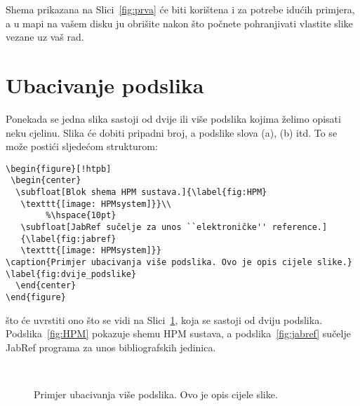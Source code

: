 Shema prikazana na Slici~\ref{fig:prva} će biti korištena i za potrebe idućih primjera, a {\color{blue} u mapi na vašem disku ju obrišite nakon što počnete pohranjivati vlastite slike vezane uz vaš rad}.


\section{Ubacivanje podslika}
Ponekada se jedna slika sastoji od dvije ili više podslika kojima želimo opisati neku cjelinu. Slika će dobiti pripadni broj, a podslike slova (a), (b) itd.
To se može postići sljedećom strukturom:
\begin{verbatim}
\begin{figure}[!htpb]
 \begin{center}
  \subfloat[Blok shema HPM sustava.]{\label{fig:HPM}
   \texttt{[image: HPMsystem]}}\\ 
	    %\hspace{10pt}
   \subfloat[JabRef sučelje za unos ``elektroničke'' reference.]
   {\label{fig:jabref}
   \texttt{[image: HPMsystem]}}
\caption{Primjer ubacivanja više podslika. Ovo je opis cijele slike.}
\label{fig:dvije_podslike}
  \end{center}
\end{figure}
\end{verbatim}
što će uvrstiti ono što se vidi na Slici~\ref{fig:dvije_podslike}, koja se sastoji od dviju podslika.
Podslika~\ref{fig:HPM} pokazuje shemu HPM sustava, a podslika~\ref{fig:jabref} sučelje JabRef programa za unos bibliografskih jedinica.

\begin{figure}[!htpb]
	  \begin{center}
	    \\ %
\caption{Primjer ubacivanja više podslika. Ovo je opis cijele slike.}
\label{fig:dvije_podslike}
	  \end{center}
\end{figure}




